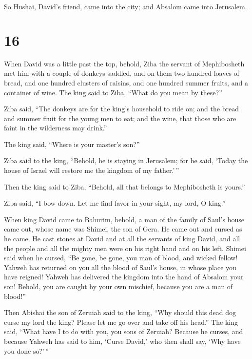  So Hushai, David's friend, came into the city; and
Absalom came into Jerusalem.

\hypertarget{section-15}{%
\section{16}\label{section-15}}

 When David was a little past the top, behold, Ziba the
servant of Mephibosheth met him with a couple of donkeys saddled, and on
them two hundred loaves of bread, and one hundred clusters of raisins,
and one hundred summer fruits, and a container of wine. 
The king said to Ziba, ``What do you mean by these?''

Ziba said, ``The donkeys are for the king's household to ride on; and
the bread and summer fruit for the young men to eat; and the wine, that
those who are faint in the wilderness may drink.''

 The king said, ``Where is your master's son?''

Ziba said to the king, ``Behold, he is staying in Jerusalem; for he
said, `Today the house of Israel will restore me the kingdom of my
father.'\,''

 Then the king said to Ziba, ``Behold, all that belongs to
Mephibosheth is yours.''

Ziba said, ``I bow down. Let me find favor in your sight, my lord, O
king.''

 When king David came to Bahurim, behold, a man of the
family of Saul's house came out, whose name was Shimei, the son of Gera.
He came out and cursed as he came.  He cast stones at
David and at all the servants of king David, and all the people and all
the mighty men were on his right hand and on his left. 
Shimei said when he cursed, ``Be gone, be gone, you man of blood, and
wicked fellow!  Yahweh has returned on you all the blood
of Saul's house, in whose place you have reigned! Yahweh has delivered
the kingdom into the hand of Absalom your son! Behold, you are caught by
your own mischief, because you are a man of blood!''

 Then Abishai the son of Zeruiah said to the king, ``Why
should this dead dog curse my lord the king? Please let me go over and
take off his head.''  The king said, ``What have I to do
with you, you sons of Zeruiah? Because he curses, and because Yahweh has
said to him, `Curse David,' who then shall say, `Why have you done
so?'\,''

